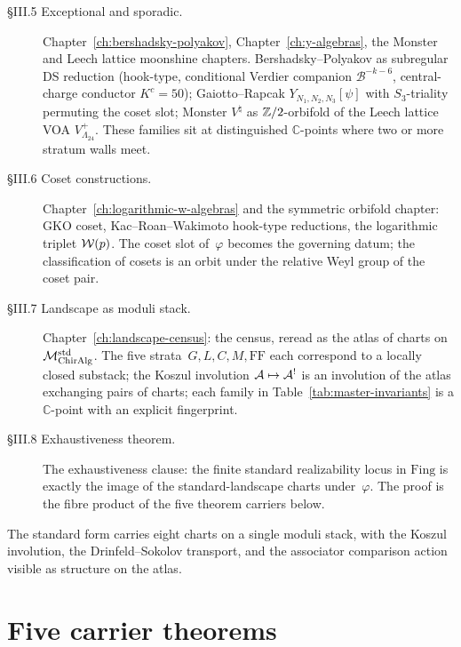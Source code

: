 \begin{description}
 \item[\S III.5 Exceptional and sporadic.]
 \label{sec:part-iii-5}
 Chapter~\ref{ch:bershadsky-polyakov}, Chapter~\ref{ch:y-algebras},
 the Monster and Leech lattice moonshine chapters. Bershadsky--Polyakov
 as subregular DS reduction (hook-type, conditional Verdier companion
 $\mathcal B^{-k-6}$, central-charge conductor
 $K^c = 50$); Gaiotto--Rapcak $Y_{N_1, N_2, N_3}[\psi]$
 with $S_3$-triality permuting the coset slot; Monster $V^\natural$
 as $\mathbb{Z}/2$-orbifold of the Leech lattice VOA
 $V_{\Lambda_{24}}^+$. These families sit at distinguished
 $\mathbb{C}$-points
 where two or more stratum walls meet.

 \item[\S III.6 Coset constructions.]
 \label{sec:part-iii-6}
 Chapter~\ref{ch:logarithmic-w-algebras} and the symmetric orbifold
 chapter: GKO coset,
 Kac--Roan--Wakimoto hook-type reductions, the logarithmic triplet
 $\mathcal{W}(p)$. The coset slot of~$\varphi$ becomes the governing datum;
 the classification of cosets is an orbit under the relative Weyl
 group of the coset pair.

 \item[\S III.7 Landscape as moduli stack.]
 \label{sec:part-iii-7}
 Chapter~\ref{ch:landscape-census}: the census, reread as the atlas
 of charts on $\mathcal{M}_{\mathrm{ChirAlg}}^{\mathrm{std}}$. The five
 strata~$G, L, C, M, \mathrm{FF}$ each correspond to a locally closed
 substack; the Koszul involution
 $\mathcal{A} \mapsto \mathcal{A}^!$ is an involution of the atlas exchanging
 pairs of charts; each family in Table~\ref{tab:master-invariants}
 is a $\mathbb{C}$-point with an explicit fingerprint.

 \item[\S III.8 Exhaustiveness theorem.]
 \label{sec:part-iii-8}
 The exhaustiveness clause: the finite standard realizability locus
 in $\mathrm{Fing}$ is exactly the image of the standard-landscape
 charts under~$\varphi$. The proof is the fibre product of the five
 theorem carriers below.
\end{description}

The standard form carries eight charts on a single moduli stack,
with the Koszul involution, the Drinfeld--Sokolov transport, and the
associator comparison action visible as structure on the atlas.

\section{Five carrier theorems}
\label{sec:part-iii-five-theorems}

